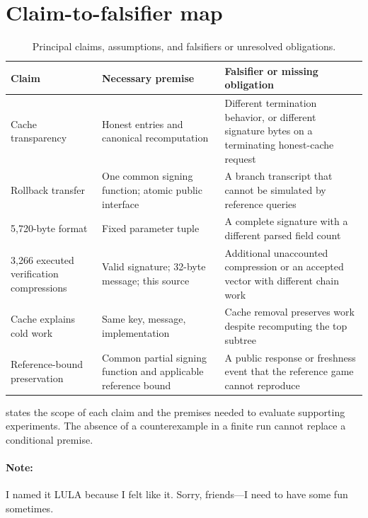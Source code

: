\documentclass[a4paper,envcountsame,runningheads]{llncs}
\begin{document}
\clearpage
\section{Claim-to-falsifier map}\label{app:falsifiers}
\begin{table}[ht]
\caption{Principal claims, assumptions, and falsifiers or unresolved obligations.}\label{tab:falsifiers}
\centering\small
\begin{tabular}{P{29mm}P{37mm}P{43mm}}\toprule
Claim & Necessary premise & Falsifier or missing obligation\\\midrule
Cache transparency & Honest entries and canonical recomputation & Different termination behavior, or different signature bytes on a terminating honest-cache request\\
Rollback transfer & One common signing function; atomic public interface & A branch transcript that cannot be simulated by reference queries\\
5,720-byte format & Fixed parameter tuple & A complete signature with a different parsed field count\\
3,266 executed verification compressions & Valid signature; 32-byte message; this source & Additional unaccounted compression or an accepted vector with different chain work\\
Cache explains cold work & Same key, message, implementation & Cache removal preserves work despite recomputing the top subtree\\
Reference-bound preservation & Common partial signing function and applicable reference bound & A public response or freshness event that the reference game cannot reproduce\\\bottomrule
\end{tabular}
\end{table}
 states the scope of each claim and the premises needed to evaluate supporting experiments. The absence of a counterexample in a finite run cannot replace a conditional premise.
\FloatBarrier
\paragraph{Note:}
I named it LULA because I felt like it. Sorry, friends---I need to have some fun sometimes.
\end{document}
